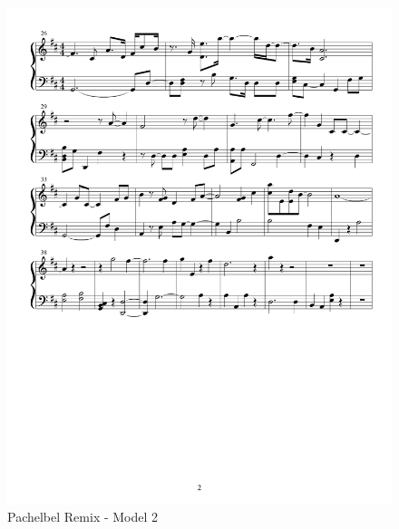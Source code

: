 \documentclass{article} %
\begin{document}
\begin{figure}[H]
\centering

\includegraphics [scale = 0.6] {PachelbelRemix2-cropped.pdf}
\caption{Pachelbel Remix - Model 2\label{P2}}
\end{figure}
\end{document}
